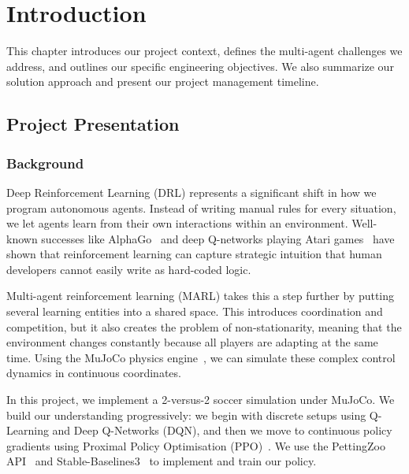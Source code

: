 \chapter{Introduction}
\label{ch:into}

This chapter introduces our project context, defines the multi-agent challenges we address, and outlines our specific engineering objectives. We also summarize our solution approach and present our project management timeline.

\section{Project Presentation}
\label{sec:proj_pres}

\subsection{Background}
\label{sec:into_back}

Deep Reinforcement Learning (DRL) represents a significant shift in how we program autonomous agents. Instead of writing manual rules for every situation, we let agents learn from their own interactions within an environment. Well-known successes like AlphaGo~\citep{silver2016mastering} and deep Q-networks playing Atari games~\citep{mnih2015humanlevel} have shown that reinforcement learning can capture strategic intuition that human developers cannot easily write as hard-coded logic.

Multi-agent reinforcement learning (MARL) takes this a step further by putting several learning entities into a shared space. This introduces coordination and competition, but it also creates the problem of non-stationarity, meaning that the environment changes constantly because all players are adapting at the same time. Using the MuJoCo physics engine~\citep{tassa2020dmcontrol}, we can simulate these complex control dynamics in continuous coordinates.

In this project, we implement a 2-versus-2 soccer simulation under MuJoCo. We build our understanding progressively: we begin with discrete setups using Q-Learning and Deep Q-Networks (DQN), and then we move to continuous policy gradients using Proximal Policy Optimisation (PPO)~\citep{schulman2017proximal}. We use the PettingZoo API~\citep{terry2021pettingzoo} and Stable-Baselines3~\citep{raffin2021stablebaselines3} to implement and train our policy.

